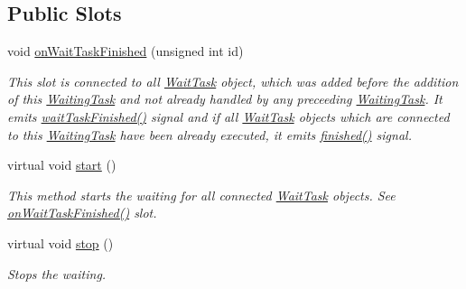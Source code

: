 \subsection*{Public Slots}
\begin{DoxyCompactItemize}
\item 
\hypertarget{class_waiting_task_a93e5b1b87723904e6a4babef1bbd4727}{}void \hyperlink{class_waiting_task_a93e5b1b87723904e6a4babef1bbd4727}{on\+Wait\+Task\+Finished} (unsigned int id)\label{class_waiting_task_a93e5b1b87723904e6a4babef1bbd4727}

\begin{DoxyCompactList}\small\item\em This slot is connected to all \hyperlink{class_wait_task}{Wait\+Task} object, which was added before the addition of this \hyperlink{class_waiting_task}{Waiting\+Task} and not already handled by any preceeding \hyperlink{class_waiting_task}{Waiting\+Task}. It emits \hyperlink{class_waiting_task_a603610acef7edaa2e0e51af6776a18ca}{wait\+Task\+Finished()} signal and if all \hyperlink{class_wait_task}{Wait\+Task} objects which are connected to this \hyperlink{class_waiting_task}{Waiting\+Task} have been already executed, it emits \hyperlink{class_exp_task_aeb51d072a7b96f55da3738a8c7733611}{finished()} signal. \end{DoxyCompactList}\item 
\hypertarget{class_waiting_task_a423901b7576a9eada13609a205da4d12}{}virtual void \hyperlink{class_waiting_task_a423901b7576a9eada13609a205da4d12}{start} ()\label{class_waiting_task_a423901b7576a9eada13609a205da4d12}

\begin{DoxyCompactList}\small\item\em This method starts the waiting for all connected \hyperlink{class_wait_task}{Wait\+Task} objects. See \hyperlink{class_waiting_task_a93e5b1b87723904e6a4babef1bbd4727}{on\+Wait\+Task\+Finished()} slot. \end{DoxyCompactList}\item 
\hypertarget{class_waiting_task_a2bb17c0359c2694e2b8af25c4fce208d}{}virtual void \hyperlink{class_waiting_task_a2bb17c0359c2694e2b8af25c4fce208d}{stop} ()\label{class_waiting_task_a2bb17c0359c2694e2b8af25c4fce208d}

\begin{DoxyCompactList}\small\item\em Stops the waiting. \end{DoxyCompactList}\end{DoxyCompactItemize}
